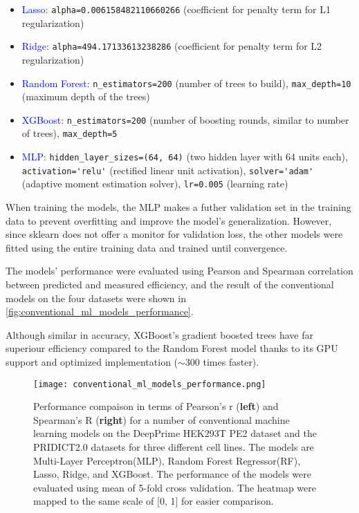 \begin{itemize}[itemsep=-0mm]
    \item \textcolor{blue}{Lasso}: \verb|alpha=0.006158482110660266| (coefficient for penalty term for L1 regularization)
    \item \textcolor{blue}{Ridge}: \verb|alpha=494.17133613238286| (coefficient for penalty term for L2 regularization)
    \item \textcolor{blue}{Random Forest}: \verb|n_estimators=200| (number of trees to build), \verb|max_depth=10| (maximum depth of the trees)
    \item \textcolor{blue}{XGBoost}: \verb|n_estimators=200| (number of boosting rounds, similar to number of trees), \verb|max_depth=5| 
    \item \textcolor{blue}{MLP}: \verb|hidden_layer_sizes=(64, 64)| (two hidden layer with 64 units each), \verb|activation='relu'| (rectified linear unit activation), \verb|solver='adam'| (adaptive moment estimation solver), \verb|lr=0.005| (learning rate)
\end{itemize}

When training the models, the MLP makes a futher validation set in the training data to prevent overfitting and improve the model's generalization. However, since sklearn does not offer a monitor for validation loss, the other models were fitted using the entire training data and trained until convergence.

The models' performance were evaluated using Pearson and Spearman correlation between predicted and measured efficiency, and the result of the conventional models on the four datasets were shown in \autoref{fig:conventional_ml_models_performance}. 

Although similar in accuracy, XGBoost's gradient boosted trees have far superiour efficiency compared to the Random Forest model thanks to its GPU support and optimized implementation ($\sim$300 times faster).

\begin{figure}
    \centering
    \texttt{[image: conventional\_ml\_models\_performance.png]}
    \caption[Conventional ML model performance comparison]{Performance compaison in terms of Pearson's r (\textbf{left}) and Spearman's R (\textbf{right}) for a number of conventional machine learning models on the DeepPrime HEK293T PE2 dataset and the PRIDICT2.0 datasets for three different cell lines. The models are Multi-Layer Perceptron(MLP), Random Forest Regressor(RF), Lasso, Ridge, and XGBoost. The performance of the models were evaluated using mean of 5-fold cross validation. The heatmap were mapped to the same scale of [0, 1] for easier comparison.}
    \label{fig:conventional_ml_models_performance}
\end{figure}


